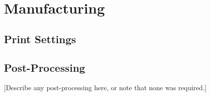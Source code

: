 \section{Manufacturing}

\subsection{Print Settings}



\subsection{Post-Processing}


[Describe any post-processing here, or note that none was required.]


